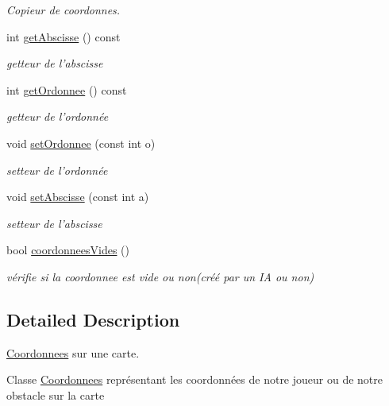 \begin{DoxyCompactItemize}
\begin{DoxyCompactList}\small\item\em Copieur de coordonnes. \end{DoxyCompactList}\item 
int \hyperlink{classCoordonnees_ad265ffa4100fe0abfab4f85b0f5a1ad9}{get\-Abscisse} () const 
\begin{DoxyCompactList}\small\item\em getteur de l'abscisse \end{DoxyCompactList}\item 
int \hyperlink{classCoordonnees_aa85ba028b69971541d3f236d7abaa132}{get\-Ordonnee} () const 
\begin{DoxyCompactList}\small\item\em getteur de l'ordonnée \end{DoxyCompactList}\item 
void \hyperlink{classCoordonnees_a3755536bdb242d6d78fc486423007448}{set\-Ordonnee} (const int o)
\begin{DoxyCompactList}\small\item\em setteur de l'ordonnée \end{DoxyCompactList}\item 
void \hyperlink{classCoordonnees_abf053f302f5b1f25af39036d5a85a80a}{set\-Abscisse} (const int a)
\begin{DoxyCompactList}\small\item\em setteur de l'abscisse \end{DoxyCompactList}\item 
bool \hyperlink{classCoordonnees_af5bf5f6a84b87f6d980669f583167a8a}{coordonnees\-Vides} ()
\begin{DoxyCompactList}\small\item\em vérifie si la coordonnee est vide ou non(créé par un I\-A ou non) \end{DoxyCompactList}\end{DoxyCompactItemize}


\subsection{Detailed Description}
\hyperlink{classCoordonnees}{Coordonnees} sur une carte. 

Classe \hyperlink{classCoordonnees}{Coordonnees} représentant les coordonnées de notre joueur ou de notre obstacle sur la carte 

